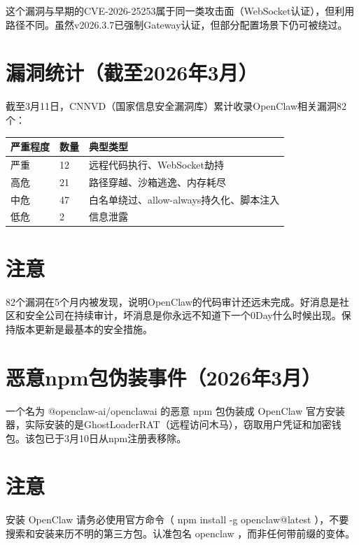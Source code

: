 \documentclass[
  10
]{article}
\newcounter{none} %
\begin{document}
这个漏洞与早期的CVE-2026-25253属于同一类攻击面（WebSocket认证），但利用路径不同。虽然v2026.3.7已强制Gateway认证，但部分配置场景下仍可被绕过。

\section{漏洞统计（截至2026年3月）}\label{ux6f0fux6d1eux7edfux8ba1ux622aux81f32026ux5e743ux6708}

截至3月11日，CNNVD（国家信息安全漏洞库）累计收录OpenClaw相关漏洞82个：

{\def\LTcaptype{none} %
\begin{longtable}[]{@{}|l|l|l|@{}}
\toprule\noalign{}
\endhead
\bottomrule\noalign{}
\endlastfoot
\hline
严重程度 & 数量 & 典型类型 \\
\hline
严重 & 12 & 远程代码执行、WebSocket劫持 \\
\hline
高危 & 21 & 路径穿越、沙箱逃逸、内存耗尽 \\
\hline
中危 & 47 & 白名单绕过、allow-always持久化、脚本注入 \\
\hline
低危 & 2 & 信息泄露 \\
\hline
\end{longtable}
}

\section{注意}\label{ux6ce8ux610f-25}

82个漏洞在5个月内被发现，说明OpenClaw的代码审计还远未完成。好消息是社区和安全公司在持续审计，坏消息是你永远不知道下一个0Day什么时候出现。保持版本更新是最基本的安全措施。

\section{恶意npm包伪装事件（2026年3月）}\label{ux6076ux610fnpmux5305ux4f2aux88c5ux4e8bux4ef62026ux5e743ux6708}

一个名为 @openclaw-ai/openclawai 的恶意 npm 包伪装成 OpenClaw
官方安装器，实际安装的是GhostLoaderRAT（远程访问木马），窃取用户凭证和加密钱包。该包已于3月10日从npm注册表移除。

\section{注意}\label{ux6ce8ux610f-26}

安装 OpenClaw 请务必使用官方命令（ npm install -g openclaw@latest
），不要搜索和安装来历不明的第三方包。认准包名 openclaw
，而非任何带前缀的变体。
\end{document}
